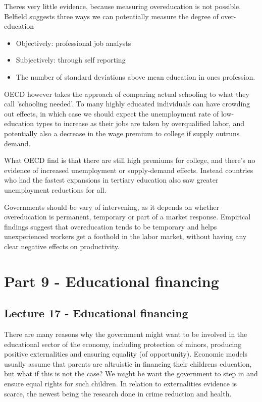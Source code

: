 \documentclass[12pt, a4paper]{article}
\begin{document}
\begin{multicols}{2}
Theres very little evidence, because measuring overeducation is not possible. Belfield suggests three ways we can potentially measure the degree of over-education
\begin{itemize}
\item Objectively: professional job analysts
\item Subjectively: through self reporting
\item The number of standard deviations above mean education in ones profession.
\end{itemize}
OECD however takes the approach of comparing actual schooling to what they call 'schooling needed'. To many highly educated individuals can have crowding out effects, in which case we should expect the unemployment rate of low-education types to increase as their jobs are taken by overqualified labor, and potentially also a decrease in the wage premium to college if supply outruns demand. 

What OECD find is that there are still high premiums for college, and there's no evidence of increased unemployment or supply-demand effects. Instead countries who had the fastest expansions in tertiary education also saw greater unemployment reductions for all.

Governments should be vary of intervening, as it depends on whether overeducation is permanent, temporary or part of a market response. Empirical findings suggest that overeducation tends to be temporary and helps unexperienced workers get a foothold in the labor market, without having any clear negative effects on productivity. 

\section{Part 9 - Educational financing}
\subsection{Lecture 17 - Educational financing}
There are many reasons why the government might want to be involved in the educational sector of the economy, including protection of minors, producing positive externalities and ensuring equality (of opportunity). Economic models usually assume that parents are altruistic in financing their childrens education, but what if this is not the case? We might be want the government to step in and ensure equal rights for such children. In relation to externalities evidence is scarce, the newest being the research done in crime reduction and health. 


\end{multicols}
\end{document}
